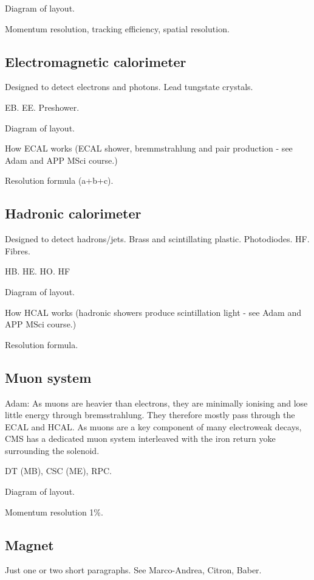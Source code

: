 Diagram of layout.

Momentum resolution, tracking efficiency, spatial resolution.

\subsection{Electromagnetic calorimeter}

Designed to detect electrons and photons. Lead tungstate crystals.

EB. EE. Preshower.

Diagram of layout.

How ECAL works (ECAL shower, bremmstrahlung and pair production - see Adam and 
APP MSci course.)

Resolution formula (a+b+c).

\subsection{Hadronic calorimeter}

Designed to detect hadrons/jets. Brass and scintillating plastic. Photodiodes. 
HF. Fibres.

HB. HE. HO. HF

Diagram of layout.

How HCAL works (hadronic showers produce scintillation light - see Adam and APP 
MSci course.)

Resolution formula.

\subsection{Muon system}

Adam: As muons are heavier than electrons, they are minimally ionising and lose 
little energy through bremsstrahlung. They therefore mostly pass through the 
ECAL and HCAL. As muons are a key component of many electroweak decays, CMS has 
a dedicated muon system interleaved with the iron return yoke surrounding the 
solenoid.
 
DT (MB), CSC (ME), RPC.

Diagram of layout.

Momentum resolution 1\%.

\subsection{Magnet}

Just one or two short paragraphs.
See Marco-Andrea, Citron, Baber.

